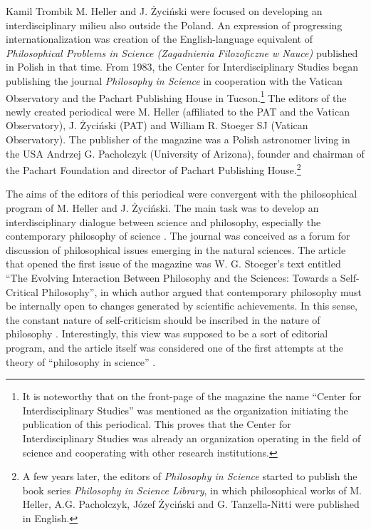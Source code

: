 \begin{artengenv}{Kamil Trombik}
M. Heller and J. Życiński were focused on developing an interdisciplinary milieu also outside the Poland. An expression
of progressing internationalization was creation of the English-language equivalent of \textit{Philosophical Problems
in Science (Zagadnienia Filozoficzne w Nauce) }published in Polish in that time. From 1983, the Center for
Interdisciplinary Studies began publishing the journal \textit{Philosophy in Science} in cooperation with the Vatican
Observatory and the Pachart Publishing House in Tucson.\footnote{It is noteworthy that on the front-page of the
magazine the name ``Center for Interdisciplinary Studies'' was mentioned as the organization initiating the publication
of this periodical. This proves that the Center for Interdisciplinary Studies was already an organization operating in
the field of science and cooperating with other research institutions.} The editors of the newly created periodical
were M. Heller (affiliated to the PAT and the Vatican Observatory), J. Życiński (PAT) and William R.
Stoeger SJ (Vatican Observatory). The publisher of the magazine was a Polish astronomer living in the USA Andrzej G.
Pacholczyk (University of Arizona), founder and chairman of the Pachart Foundation and director of Pachart Publishing
House.\footnote{A few years later, the editors of \textit{Philosophy in Science} started to publish the book series
\textit{Philosophy in Science Library}, in which philosophical works of M. Heller, A.G. Pacholczyk, Józef Życiński and
G. Tanzella-Nitti were published in English.}

The aims of the editors of this periodical were convergent with the philosophical program of M. Heller and J. Życiński.
The main task was to develop an interdisciplinary dialogue between science and philosophy, especially the contemporary
philosophy of science
\parencite[p.8]{heller_introduction_1983}.
The
journal was conceived as a forum for discussion of philosophical issues emerging in the natural sciences. The article
that opened the first issue of the magazine was W. G. Stoeger's text entitled ``The Evolving Interaction Between
Philosophy and the Sciences: Towards a Self-Critical Philosophy'', in which author argued that contemporary philosophy
must be internally open to changes generated by scientific achievements. In this sense, the constant nature of
self-criticism should be inscribed in the nature of philosophy
\parencite[pp.39--43]{stoeger_evolving_1983}.
Interestingly, this view was supposed to
be a sort of editorial program, and the article itself was considered one of the first attempts at the theory of
``philosophy in science''
\parencites[p.7]{heller_jak_1986}[p.\pageref{heller-stoeger}]{heller_how_2019}.


\end{artengenv}
